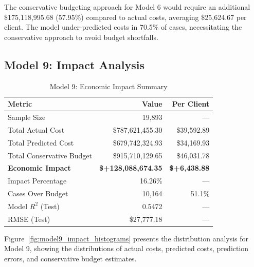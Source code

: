 The conservative budgeting approach for Model 6 would require an additional \$175,118,995.68 (57.95\%) compared to actual costs, averaging \$25,624.67 per client. The model under-predicted costs in 70.5\% of cases, necessitating the conservative approach to avoid budget shortfalls.

\clearpage

\subsection{Model 9: Impact Analysis}
\label{subsec:model9_impact}

\begin{table}[htbp]
\centering
\small
\caption{Model 9: Economic Impact Summary}
\label{tab:model9_impact_summary}
\begin{tabular}{lrr}
\toprule
\textbf{Metric} & \textbf{Value} & \textbf{Per Client} \\
\midrule
Sample Size & 19,893 & --- \\
\midrule
Total Actual Cost & \$787,621,455.30 & \$39,592.89 \\
Total Predicted Cost & \$679,742,324.93 & \$34,169.93 \\
Total Conservative Budget & \$915,710,129.65 & \$46,031.78 \\
\midrule
\textbf{Economic Impact} & \textbf{\$+128,088,674.35} & \textbf{\$+6,438.88} \\
Impact Percentage & 16.26\% & --- \\
\midrule
Cases Over Budget & 10,164 & 51.1\% \\
\midrule
Model $R^2$ (Test) & 0.5472 & --- \\
RMSE (Test) & \$27,777.18 & --- \\
\bottomrule
\end{tabular}
\end{table}

Figure~\ref{fig:model9_impact_histograms} presents the distribution analysis for Model 9, showing the distributions of actual costs, predicted costs, prediction errors, and conservative budget estimates.

